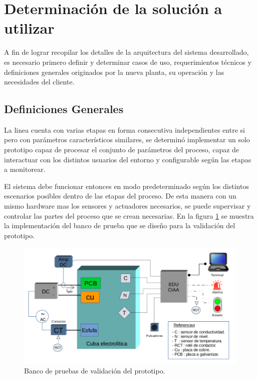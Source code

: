 \section{ Determinación de la solución a utilizar } 

A fin de lograr recopilar los detalles de la arquitectura del sistema desarrollado, es necesario primero definir y determinar casos de uso, requerimientos técnicos y definiciones generales originados por la nueva planta, su operación y las necesidades del cliente. 

\subsection{ Definiciones Generales }

La linea cuenta con varias etapas en forma consecutiva independientes entre si pero con parámetros característicos similares, se determinó implementar un solo prototipo capaz de procesar el conjunto de parámetros del proceso, capaz de interactuar con los distintos usuarios del entorno y configurable según las etapas a monitorear.

El sistema debe funcionar entonces en modo predeterminado según los distintos escenarios posibles dentro de las etapas del proceso. De esta manera con un mismo hardware mas los sensores y actuadores necesarios, se puede supervisar y controlar las partes del proceso que se crean necesarias. En la figura \ref{fig:banco_pruebas} se muestra la implementación del banco de prueba que se diseño para la validación del prototipo.

\begin{figure}[h!]
	\centering
	\includegraphics[width=1.2\textwidth]{Figures/Cap_2/diagrama_prototipo}
	\caption{Banco de pruebas de validación del prototipo. }
	\label{fig:banco_pruebas}
\end{figure}

